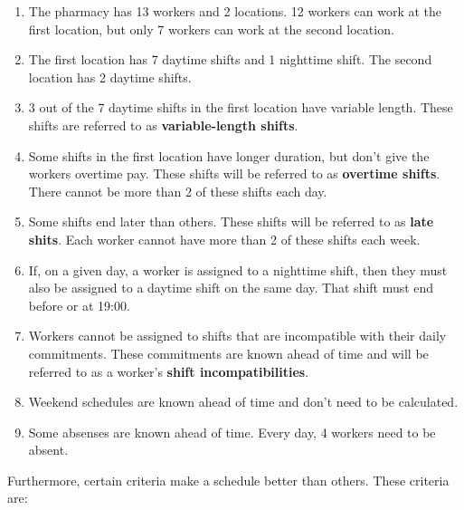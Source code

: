 \documentclass[conference]{IEEEtran}
\begin{document}
\begin{enumerate}[start]
    \item {
        \label{constraint:domain}
        The pharmacy has 13 workers and 2 locations. 12 workers can work at the first location, but only 7 workers can work at the second location.
    }
    \item {
        \label{constraint:shifts}
        The first location has 7 daytime shifts and 1 nighttime shift. The second location has 2 daytime shifts.
    }
    \item {
        \label{constraint:variable-length-shifts}
        3 out of the 7 daytime shifts in the first location have variable length. These shifts are referred to as \textbf{variable-length shifts}.
    }
    \item {
        \label{constraint:overtime-shifts}
        Some shifts in the first location have longer duration, but don't give the workers overtime pay. These shifts will be referred to as \textbf{overtime shifts}. There cannot be more than 2 of these shifts each day.
    }
    \item {
        \label{constraint:late-shifts}
        Some shifts end later than others. These shifts will be referred to as \textbf{late shits}. Each worker cannot have more than 2 of these shifts each week.
    }
    \item {
        \label{constraint:nighttime-shift-implies-daytime-shift}
        If, on a given day, a worker is assigned to a nighttime shift, then they must also be assigned to a daytime shift on the same day. That shift must end before or at 19:00.
    }
    \item {
        \label{constraint:shift-incompatibilities}
        Workers cannot be assigned to shifts that are incompatible with their daily commitments. These commitments are known ahead of time and will be referred to as a worker's \textbf{shift incompatibilities}.
    }
    \item {
        \label{constraint:weekend-schedules-known-ahead-of-time}
        Weekend schedules are known ahead of time and don't need to be calculated.
    }
    \item {
        \label{constraint:absenses-known-ahead-of-time}
        Some absenses are known ahead of time. Every day, 4 workers need to be absent.
    }
\end{enumerate}

Furthermore, certain criteria make a schedule better than others. These criteria are:
\end{document}

